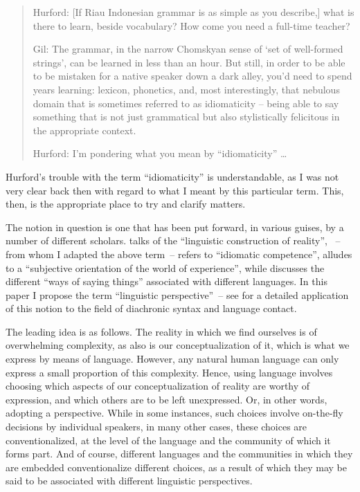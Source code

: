 \documentclass[output=paper]{langscibook}
\begin{document}
\begin{quote}
    Hurford:	[If Riau Indonesian grammar is as simple as you describe,] what is there to learn, beside vocabulary? How come you need a full-time teacher?

    Gil: The grammar, in the narrow Chomskyan sense of ‘set of well-formed strings’, can be learned in less than an hour. But still, in order to be able to be mistaken for a native speaker down a dark alley, you’d need to spend years learning: lexicon, phonetics, and, most interestingly, that nebulous domain that is sometimes referred to as idiomaticity – being able to say something that is not just grammatical but also stylistically felicitous in the appropriate context.

    Hurford:	I'm pondering what you mean by ``idiomaticity''  \ldots 
\end{quote}

Hurford's trouble with the term ``idiomaticity'' is understandable, as I was not very clear back then with regard to what I meant by this particular term.  This, then, is the appropriate place to try and clarify matters.

The notion in question is one that has been put forward, in various guises, by a number of different
scholars. \citet{grace1987linguistic} talks of the ``linguistic construction of reality'',
\citet{pawley1993language}~– from whom I adapted the above term~– refers to ``idiomatic competence'',
\citet[91]{slobin1996thought} alludes to a ``subjective orientation of the world of experience'',
while \citet{ross2001contact} discusses the different ``ways of saying things'' associated with
different languages.  In this paper I propose the term ``linguistic perspective''~– see \citet{gil2023recent} for a detailed application of this notion to the field of diachronic syntax and language contact.

The leading idea is as follows.  The reality in which we find ourselves is of overwhelming complexity, as also is our conceptualization of it, which is what we express by means of language.  However, any natural human language can only express a small proportion of this complexity.  Hence, using language involves choosing which aspects of our conceptualization of reality are worthy of expression, and which others are to be left unexpressed.  Or, in other words, adopting a perspective.  While in some instances, such choices involve on-the-fly decisions by individual speakers, in many other cases, these choices are conventionalized, at the level of the language and the community of which it forms part.  And of course, different languages and the communities in which they are embedded conventionalize different choices, as a result of which they may be said to be associated with different linguistic perspectives.
\end{document}
